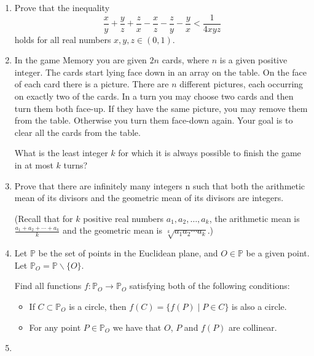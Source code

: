 \documentclass{article}
\begin{document}
\begin{enumerate}[1.]

\vspace{6pt}
\item %
Prove that the inequality \[ \frac{x}{y} +\frac{y}{z} +\frac{z}{x} -\frac{x}{z} -\frac{z}{y} -\frac{y}{x} < \frac{1}{4xyz} \] holds for all real numbers $x,y,z \in (0,1)$.


\vspace{6pt}
\item %
In the game Memory you are given $2n$ cards, where $n$ is a given positive integer. The cards start lying face down in an array on the table. On the face of each card there is a picture. There are $n$ different pictures, each occurring on exactly two of the cards. In a turn you may choose two cards and then turn them both face-up. If they have the same picture, you may remove them from the table. Otherwise you turn them face-down again. Your goal is to clear all the cards from the table.

What is the least integer $k$ for which it is always possible to finish the game in at most $k$ turns?


\vspace{6pt}
\item %
Prove that there are infinitely many integers n such that both the arithmetic mean of its divisors and the geometric mean of its divisors are integers.

(Recall that for $k$ positive real numbers $a_1, a_2, \dotsc, a_k$, the arithmetic mean is $\frac{a_1 +a_2 +\dotsb +a_k}{k}$ and the geometric mean is $\sqrt[k]{a_1 a_2 \dotsm a_k}$.)


\vspace{6pt}
\item %
Let $\mathbb{P}$ be the set of points in the Euclidean plane, and $O \in \mathbb{P}$ be a given point. Let $\mathbb{P}_O = \mathbb{P} \backslash \{O\}$.

Find all functions $f : \mathbb{P}_O \to \mathbb{P}_O$ satisfying both of the following conditions:
\begin{itemize}
  \item If $C \subset \mathbb{P}_O$ is a circle, then $f(C) = \{ f(P) \mid P \in C \}$ is also a circle.
  \item For any point $P \in \mathbb{P}_O$ we have that $O$, $P$ and $f(P)$ are collinear.
\end{itemize}


\vspace{6pt}
\item



\end{enumerate}
\end{document}

